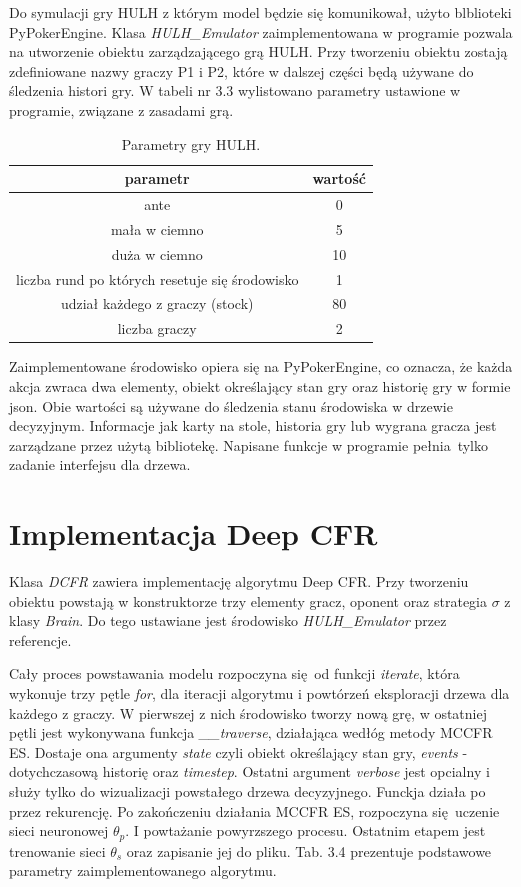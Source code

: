 \documentclass[12pt,oneside,a4paper]{report}
\begin{document}
Do symulacji gry HULH z którym model będzie się komunikował, użyto blblioteki PyPokerEngine.
Klasa 
\emph{HULH\_Emulator} 
zaimplementowana w programie pozwala na utworzenie obiektu
zarządzającego grą HULH. Przy tworzeniu obiektu zostają zdefiniowane 
nazwy graczy P1 i P2, które w dalszej części będą używane do śledzenia histori gry. 
W tabeli nr 3.3 wylistowano parametry ustawione w programie, związane z zasadami grą.


\begin{table}[h!]
\centering
\caption{Parametry gry HULH.}
\begin{tabular}{|c|c| }
   \hline
   parametr & wartość \\
    \hline
   ante & 0  \\ 
   \hline
   mała w ciemno & 5  \\  
   \hline
   duża w ciemno & 10 \\
   \hline
   liczba rund po których resetuje się środowisko & 1  \\
   \hline
   udział każdego z graczy (stock) & 80  \\
   \hline
   liczba graczy & 2 \\
   \hline
\end{tabular}
\end{table}

Zaimplementowane środowisko opiera się na PyPokerEngine, co oznacza, że każda akcja zwraca dwa
elementy, obiekt określający stan gry oraz historię gry w formie json. Obie wartości są używane do
śledzenia stanu środowiska w drzewie decyzyjnym. Informacje jak karty na stole, historia gry lub 
wygrana gracza jest zarządzane przez użytą bibliotekę. Napisane funkcje w programie pełnia tylko 
zadanie interfejsu dla drzewa.


\section{Implementacja Deep CFR}

Klasa \emph{DCFR} zawiera implementację algorytmu Deep CFR. 
Przy tworzeniu obiektu powstają w
konstruktorze trzy elementy gracz, oponent oraz strategia $\sigma$ z klasy \emph{Brain}.
Do tego ustawiane jest środowisko \emph{HULH\_Emulator} przez referencje.

Cały proces powstawania modelu rozpoczyna się od funkcji \emph{iterate}, która wykonuje trzy pętle
\emph{for},
dla iteracji algorytmu i powtórzeń eksploracji drzewa dla każdego z graczy. W pierwszej z nich 
środowisko tworzy nową grę, w ostatniej pętli jest wykonywana funkcja \emph{\_\_traverse},
działająca wedłóg metody MCCFR ES. Dostaje ona argumenty \emph{state} czyli obiekt określający
stan gry, \emph{events} - dotychczasową historię oraz \emph{timestep}.
Ostatni argument \emph{verbose} jest opcialny i służy tylko do wizualizacji powstałego drzewa
decyzyjnego. Funckja działa po przez rekurencję.
Po zakończeniu działania MCCFR ES, rozpoczyna się uczenie sieci neuronowej $\theta_{p}$. I
powtażanie powyrzszego procesu. 
Ostatnim etapem jest trenowanie sieci $\theta_{s}$ oraz zapisanie jej do pliku.
Tab. 3.4 prezentuje podstawowe parametry zaimplementowanego algorytmu.
\end{document}
